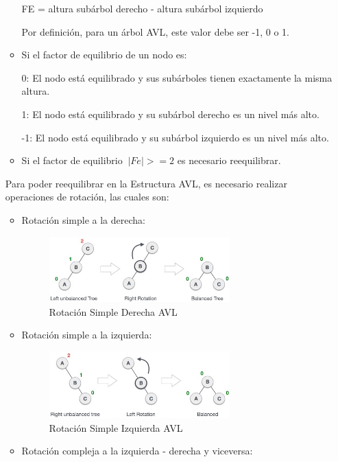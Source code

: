 \documentclass{article}
\begin{document}
\begin{enumerate}
\begin{itemize}
   FE = altura subárbol derecho - altura subárbol izquierdo
   
   Por definición, para un árbol AVL, este valor debe ser -1, 0 o 1.
   \item Si el factor de equilibrio de un nodo es:
   
   0: El nodo está equilibrado y sus subárboles tienen exactamente la misma altura.
   
   1: El nodo está equilibrado y su subárbol derecho es un nivel más alto.
   
   -1: El nodo está equilibrado y su subárbol izquierdo es un nivel más alto.
   \item Si el factor de equilibrio $\ |Fe|>=2 $ es necesario reequilibrar.
\end{itemize}

Para poder reequilibrar en la Estructura AVL, es necesario realizar operaciones de rotación, las cuales son:

 \begin{itemize}
   \item Rotación simple a la derecha:

\begin{figure}[H]
\centering
\includegraphics[width=0.7\textwidth]{Img/avl_right_rotation.jpg}
\caption{Rotación Simple Derecha AVL}
\end{figure}
   
   \item Rotación simple a la izquierda:

\begin{figure}[H]
\centering
\includegraphics[width=0.7\textwidth]{Img/avl_left_rotation.jpg}
\caption{Rotación Simple Izquierda AVL}
\end{figure}
   
   \item Rotación compleja a la izquierda - derecha y viceversa:


\end{itemize}
\end{enumerate}
\end{document}
